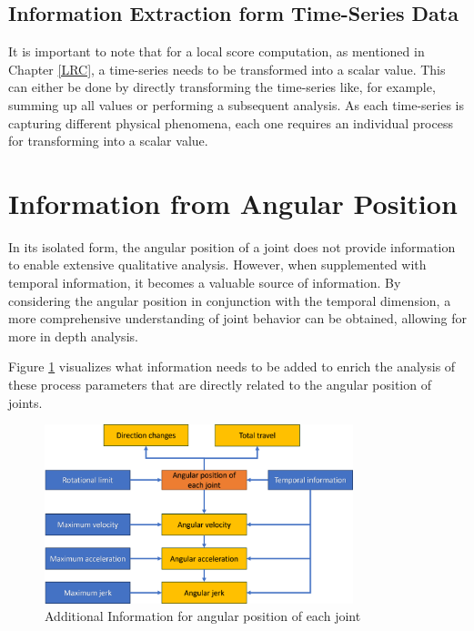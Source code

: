  
\subsection{Information Extraction form Time-Series Data}\label{extraction}
It is important to note that for a local score computation, as mentioned in Chapter \ref{LRC}, a time-series needs to be transformed into a scalar value. This can either be done by directly transforming the time-series like, for example, summing up all values or performing a subsequent analysis. As each time-series is capturing different physical phenomena, each one requires an individual process for transforming into a scalar value.
\newpage




\section{Information from Angular Position}
In its isolated form, the angular position of a joint does not provide information to enable extensive qualitative analysis. However, when supplemented with temporal information, it becomes a valuable source of information. By considering the angular position in conjunction with the temporal dimension, a more comprehensive understanding of joint behavior can be obtained, allowing for more in depth analysis.



Figure \ref{agularstuff} visualizes what information needs to be added to enrich the analysis of these process parameters that are directly related to the angular position of joints.

\begin{figure}[H]
	\centerline{\includegraphics[width=0.8\textwidth]{figures/angularstuff.png}}
	\caption{Additional Information for angular position of each joint}
	\label{agularstuff}
\end{figure}



